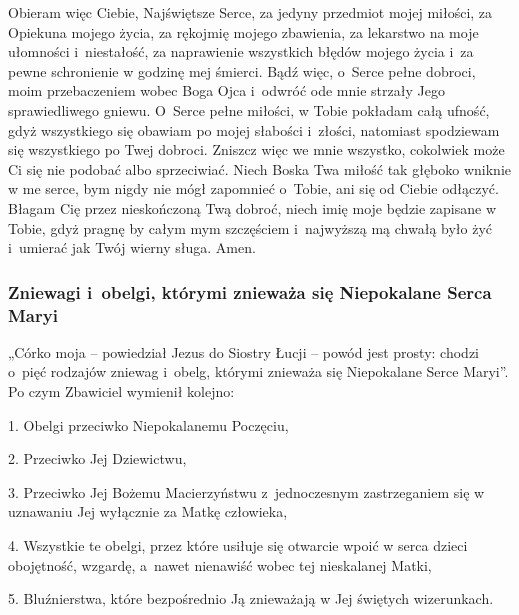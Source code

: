 \documentclass[twocolumn,fleqn,oneside,openany,a5paper,12pt]{book}
\begin{document}
Obieram więc Ciebie, Najświętsze Serce, za jedyny przedmiot mojej miłości, za Opiekuna mojego życia, za rękojmię mojego zbawienia, za lekarstwo na moje ułomności i~niestałość, za naprawienie wszystkich błędów mojego życia i~za
pewne schronienie w godzinę mej śmierci. Bądź więc, o~Serce pełne dobroci, moim przebaczeniem wobec Boga Ojca i~odwróć ode mnie strzały Jego sprawiedliwego gniewu. O~Serce pełne miłości, w Tobie pokładam całą ufność, gdyż wszystkiego się obawiam po mojej słabości i~złości, natomiast spodziewam się wszystkiego po Twej dobroci.
Zniszcz więc we mnie wszystko, cokolwiek może Ci się nie podobać albo sprzeciwiać. Niech Boska Twa miłość tak głęboko wniknie w me serce, bym nigdy nie mógł zapomnieć o~Tobie, ani się od Ciebie odłączyć. Błagam Cię przez nieskończoną Twą dobroć, niech imię moje będzie zapisane w Tobie, gdyż pragnę by całym mym szczęściem i~najwyższą mą chwałą było żyć i~umierać jak Twój wierny sługa. Amen.

\subsubsection*{Zniewagi i~obelgi, którymi znieważa się Niepokalane Serca Maryi}
„Córko moja – powiedział Jezus do Siostry Łucji – powód jest prosty: chodzi o~pięć rodzajów zniewag i~obelg, którymi znieważa się Niepokalane Serce Maryi”. Po czym Zbawiciel wymienił kolejno:

1. Obelgi przeciwko Niepokalanemu Poczęciu, 

2. Przeciwko Jej Dziewictwu, 

3. Przeciwko Jej Bożemu Macierzyństwu z~jednoczesnym zastrzeganiem się w uznawaniu Jej wyłącznie za Matkę człowieka, 

4. Wszystkie te obelgi, przez które usiłuje się otwarcie wpoić w serca dzieci obojętność, wzgardę, a~nawet nienawiść wobec tej nieskalanej Matki, 

5. Bluźnierstwa, które bezpośrednio Ją znieważają w Jej świętych wizerunkach.
\end{document}
